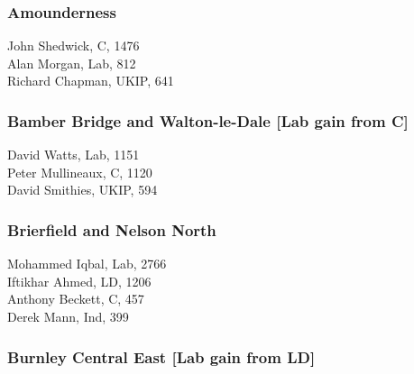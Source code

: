 \documentclass[a4paper,openany,10pt]{book}
\begin{document}
\subsubsection*{Amounderness}



John Shedwick, C, 1476\\
Alan Morgan, Lab, 812\\
Richard Chapman, UKIP, 641\\


\subsubsection*{Bamber Bridge and Walton-le-Dale \hspace*{\fill}\nolinebreak[1]%
\enspace\hspace*{\fill}
[Lab gain from C]}



David Watts, Lab, 1151\\
Peter Mullineaux, C, 1120\\
David Smithies, UKIP, 594\\


\subsubsection*{Brierfield and Nelson North}



Mohammed Iqbal, Lab, 2766\\
Iftikhar Ahmed, LD, 1206\\
Anthony Beckett, C, 457\\
Derek Mann, Ind, 399\\


\subsubsection*{Burnley Central East \hspace*{\fill}\nolinebreak[1]%
\enspace\hspace*{\fill}
[Lab gain from LD]}

\end{document}
